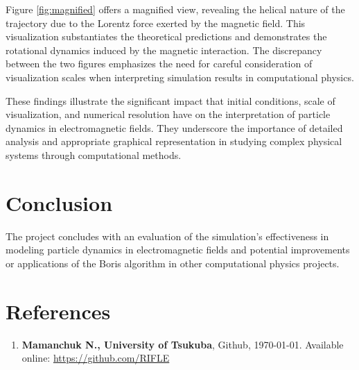 \documentclass{article}
\begin{document}
Figure \ref{fig:magnified} offers a magnified view, revealing the helical nature of the trajectory due to the Lorentz force exerted by the magnetic field. This visualization substantiates the theoretical predictions and demonstrates the rotational dynamics induced by the magnetic interaction. The discrepancy between the two figures emphasizes the need for careful consideration of visualization scales when interpreting simulation results in computational physics.

These findings illustrate the significant impact that initial conditions, scale of visualization, and numerical resolution have on the interpretation of particle dynamics in electromagnetic fields. They underscore the importance of detailed analysis and appropriate graphical representation in studying complex physical systems through computational methods.

\section{Conclusion}
The project concludes with an evaluation of the simulation's effectiveness in modeling particle dynamics in electromagnetic fields and potential improvements or applications of the Boris algorithm in other computational physics projects.


\section*{References}
\begin{enumerate}
    \item \textbf{Mamanchuk N., University of Tsukuba}, Github, \today. Available online: \url{https://github.com/RIFLE}
\end{enumerate}
\end{document}

